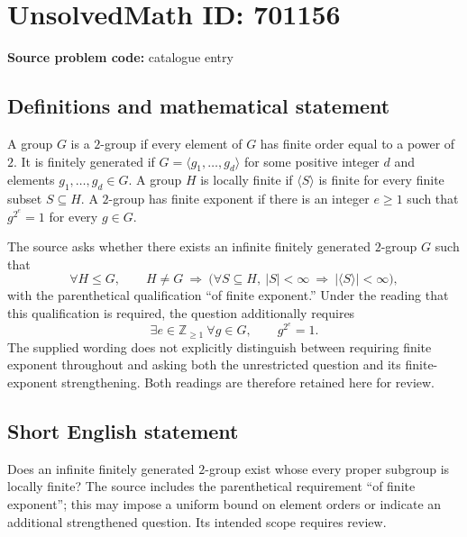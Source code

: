 \documentclass[11pt]{article}
\newcommand{\Z}{\mathbb{Z}}
\begin{document}
\section*{UnsolvedMath ID: 701156}
\textbf{Source problem code:} catalogue entry
\subsection{Definitions and mathematical statement}
A group \(G\) is a \(2\)-group if every element of \(G\) has finite order equal to a power of \(2\). It is finitely generated if \(G=\langle g_1,\ldots,g_d\rangle\) for some positive integer \(d\) and elements \(g_1,\ldots,g_d\in G\). A group \(H\) is locally finite if \(\langle S\rangle\) is finite for every finite subset \(S\subseteq H\). A \(2\)-group has finite exponent if there is an integer \(e\geq 1\) such that \(g^{2^e}=1\) for every \(g\in G\).

The source asks whether there exists an infinite finitely generated \(2\)-group \(G\) such that
\[
\forall H\leq G,\qquad H\neq G\ \Longrightarrow\ \bigl(\forall S\subseteq H,\ |S|<\infty\ \Longrightarrow\ |\langle S\rangle|<\infty\bigr),
\]
with the parenthetical qualification ``of finite exponent.'' Under the reading that this qualification is required, the question additionally requires
\[
\exists e\in\Z_{\geq 1}\ \forall g\in G,\qquad g^{2^e}=1.
\]
The supplied wording does not explicitly distinguish between requiring finite exponent throughout and asking both the unrestricted question and its finite-exponent strengthening. Both readings are therefore retained here for review.
\subsection{Short English statement}
Does an infinite finitely generated \(2\)-group exist whose every proper subgroup is locally finite? The source includes the parenthetical requirement ``of finite exponent''; this may impose a uniform bound on element orders or indicate an additional strengthened question. Its intended scope requires review.
\end{document}
